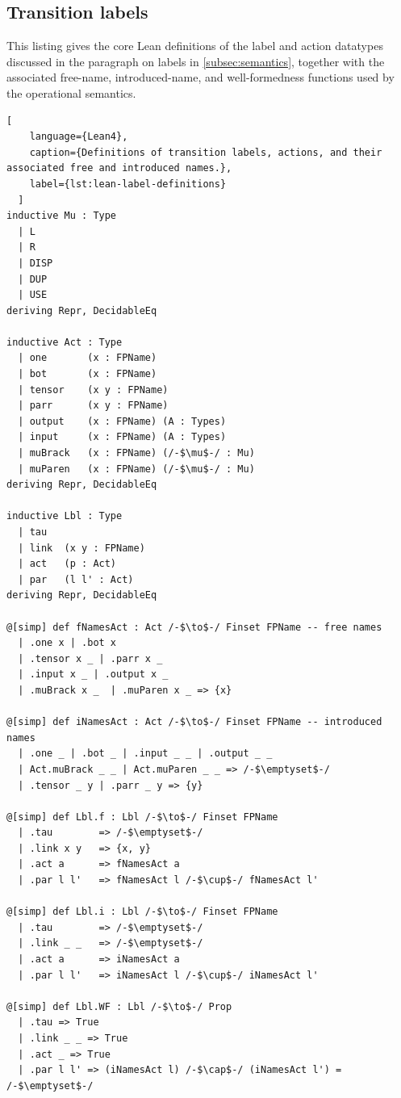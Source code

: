 \subsection{Transition labels}\label{app:labels}
This listing gives the core Lean definitions of the label and action datatypes discussed in the paragraph on labels in \cref{subsec:semantics}, together with the associated free-name, introduced-name, and well-formedness functions used by the operational semantics.

\begin{lstlisting}[
    language={Lean4},
    caption={Definitions of transition labels, actions, and their associated free and introduced names.},
    label={lst:lean-label-definitions}
  ]
inductive Mu : Type
  | L
  | R
  | DISP
  | DUP
  | USE
deriving Repr, DecidableEq

inductive Act : Type
  | one       (x : FPName)
  | bot       (x : FPName)
  | tensor    (x y : FPName)
  | parr      (x y : FPName)
  | output    (x : FPName) (A : Types)
  | input     (x : FPName) (A : Types)
  | muBrack   (x : FPName) (/-$\mu$-/ : Mu)
  | muParen   (x : FPName) (/-$\mu$-/ : Mu)
deriving Repr, DecidableEq

inductive Lbl : Type
  | tau
  | link  (x y : FPName)
  | act   (p : Act)
  | par   (l l' : Act)
deriving Repr, DecidableEq

@[simp] def fNamesAct : Act /-$\to$-/ Finset FPName -- free names
  | .one x | .bot x
  | .tensor x _ | .parr x _
  | .input x _ | .output x _
  | .muBrack x _  | .muParen x _ => {x}

@[simp] def iNamesAct : Act /-$\to$-/ Finset FPName -- introduced names
  | .one _ | .bot _ | .input _ _ | .output _ _
  | Act.muBrack _ _ | Act.muParen _ _ => /-$\emptyset$-/
  | .tensor _ y | .parr _ y => {y}

@[simp] def Lbl.f : Lbl /-$\to$-/ Finset FPName
  | .tau        => /-$\emptyset$-/
  | .link x y   => {x, y}
  | .act a      => fNamesAct a
  | .par l l'   => fNamesAct l /-$\cup$-/ fNamesAct l'

@[simp] def Lbl.i : Lbl /-$\to$-/ Finset FPName
  | .tau        => /-$\emptyset$-/
  | .link _ _   => /-$\emptyset$-/
  | .act a      => iNamesAct a
  | .par l l'   => iNamesAct l /-$\cup$-/ iNamesAct l'

@[simp] def Lbl.WF : Lbl /-$\to$-/ Prop
  | .tau => True
  | .link _ _ => True
  | .act _ => True
  | .par l l' => (iNamesAct l) /-$\cap$-/ (iNamesAct l') = /-$\emptyset$-/
\end{lstlisting}

